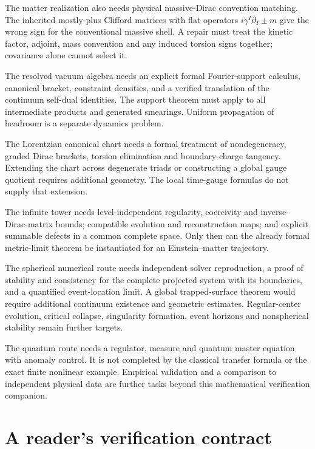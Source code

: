 The matter realization also needs physical massive-Dirac convention matching. The inherited mostly-plus Clifford matrices with flat operators \(i\gamma^I\partial_I\pm m\) give the wrong sign for the conventional massive shell. A repair must treat the kinetic factor, adjoint, mass convention and any induced torsion signs together; covariance alone cannot select it.

The resolved vacuum algebra needs an explicit formal Fourier-support calculus, canonical bracket, constraint densities, and a verified translation of the continuum self-dual identities. The support theorem must apply to all intermediate products and generated smearings. Uniform propagation of headroom is a separate dynamics problem.

The Lorentzian canonical chart needs a formal treatment of nondegeneracy, graded Dirac brackets, torsion elimination and boundary-charge tangency. Extending the chart across degenerate triads or constructing a global gauge quotient requires additional geometry. The local time-gauge formulas do not supply that extension.

The infinite tower needs level-independent regularity, coercivity and inverse-Dirac-matrix bounds; compatible evolution and reconstruction maps; and explicit summable defects in a common complete space. Only then can the already formal metric-limit theorem be instantiated for an Einstein--matter trajectory.

The spherical numerical route needs independent solver reproduction, a proof of stability and consistency for the complete projected system with its boundaries, and a quantified event-location limit. A global trapped-surface theorem would require additional continuum existence and geometric estimates. Regular-center evolution, critical collapse, singularity formation, event horizons and nonspherical stability remain further targets.

The quantum route needs a regulator, measure and quantum master equation with anomaly control. It is not completed by the classical transfer formula or the exact finite nonlinear example. Empirical validation and a comparison to independent physical data are further tasks beyond this mathematical verification companion.

\clearpage
\section{A reader's verification contract}\label{c:verify:contract}


